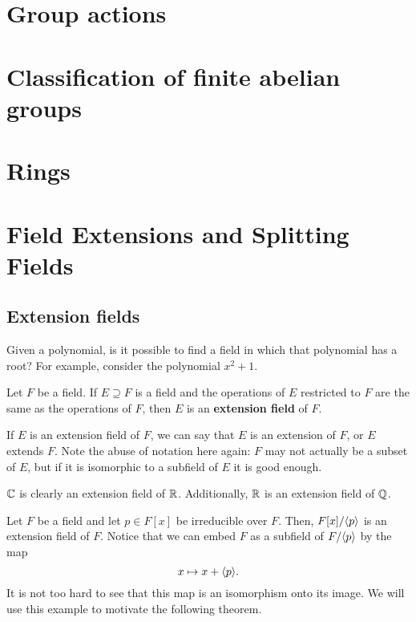 \documentclass[oneside]{book}
\begin{document}
\chapter{Group actions}
\label{chapter:group-actions}


\chapter{Classification of finite abelian groups}
\label{chapter:classification-of-finite-abelian-groups}


\chapter{Rings}
\label{chapter:introduction-to-rings}

 
\chapter{Field Extensions and Splitting Fields}

\section{Extension fields}
Given a polynomial, is it possible to find a field in which that polynomial has
a root? For example, consider the polynomial $x^2 + 1$. 

\begin{definition}
    Let $F$ be a field. If $E \supseteq F$ is a field and the operations of $E$
    restricted to $F$ are the same as the operations of $F$, then $E$ is an
    \textbf{extension field} of $F$.
\end{definition}
If $E$ is an extension field of $F$, we can say that $E$ is an extension of $F$,
or $E$ extends $F$. Note the abuse of notation here again: $F$ may not actually
be a subset of $E$, but if it is isomorphic to a subfield of $E$ it is good
enough.

\begin{example}
    $\mathbb{C}$ is clearly an extension field of $\mathbb{R}$. Additionally, $\mathbb{R}$ is an
    extension field of $\mathbb{Q}$.
\end{example}

\begin{example}
    Let $F$ be a field and let $p \in F[x]$ be irreducible over $F$. Then,
    $F[x]/{ \langle p \rangle }$ is an extension field of $F$. Notice that we can embed $F$ as
    a subfield of $F/{ \langle p \rangle }$ by the map 
    \[
        x \mapsto x + { \langle p \rangle }.
    \]
    It is not too hard to see that this map is an isomorphism onto its image. We
    will use this example to motivate the following theorem.
\end{example}
\end{document}
